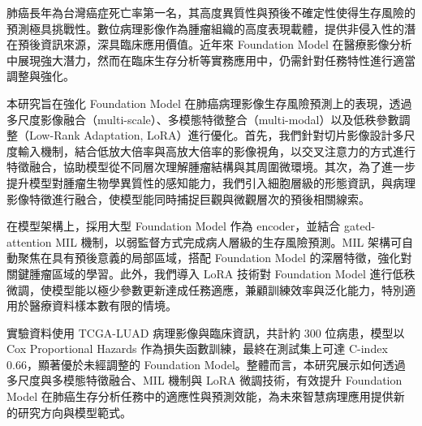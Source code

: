 
\begin{zhAbstract}

    肺癌長年為台灣癌症死亡率第一名，其高度異質性與預後不確定性使得生存風險的預測極具挑戰性。數位病理影像作為腫瘤組織的高度表現載體，提供非侵入性的潛在預後資訊來源，深具臨床應用價值。近年來 Foundation Model 在醫療影像分析中展現強大潛力，然而在臨床生存分析等實務應用中，仍需針對任務特性進行適當調整與強化。

本研究旨在強化 Foundation Model 在肺癌病理影像生存風險預測上的表現，透過多尺度影像融合（multi-scale）、多模態特徵整合（multi-modal）以及低秩參數調整（Low-Rank Adaptation, LoRA）進行優化。首先，我們針對切片影像設計多尺度輸入機制，結合低放大倍率與高放大倍率的影像視角，以交叉注意力的方式進行特徵融合，協助模型從不同層次理解腫瘤結構與其周圍微環境。其次，為了進一步提升模型對腫瘤生物學異質性的感知能力，我們引入細胞層級的形態資訊，與病理影像特徵進行融合，使模型能同時捕捉巨觀與微觀層次的預後相關線索。

在模型架構上，採用大型 Foundation Model 作為 encoder，並結合 gated-attention MIL 機制，以弱監督方式完成病人層級的生存風險預測。MIL 架構可自動聚焦在具有預後意義的局部區域，搭配 Foundation Model 的深層特徵，強化對關鍵腫瘤區域的學習。此外，我們導入 LoRA 技術對 Foundation Model 進行低秩微調，使模型能以極少參數更新達成任務適應，兼顧訓練效率與泛化能力，特別適用於醫療資料樣本數有限的情境。

實驗資料使用 TCGA-LUAD 病理影像與臨床資訊，共計約 300 位病患，模型以 Cox Proportional Hazards 作為損失函數訓練，最終在測試集上可達 C-index 0.66，顯著優於未經調整的 Foundation Model。整體而言，本研究展示如何透過多尺度與多模態特徵融合、MIL 機制與 LoRA 微調技術，有效提升 Foundation Model 在肺癌生存分析任務中的適應性與預測效能，為未來智慧病理應用提供新的研究方向與模型範式。
    \zhAbsKeywords
\end{zhAbstract}
